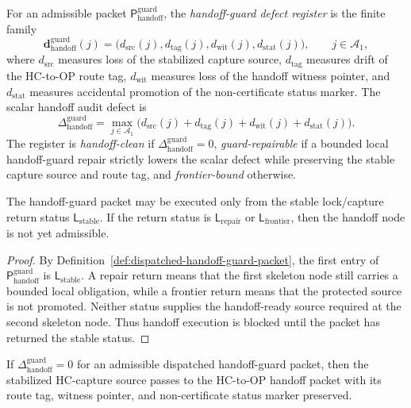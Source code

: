 \begin{definition}
\label{def:handoff-guard-defect-register}
For an admissible packet \(\mathsf P_{\mathrm{handoff}}^{\mathrm{guard}}\), the \emph{handoff-guard defect register} is the finite family
\[
 \mathbf d_{\mathrm{handoff}}^{\mathrm{guard}}(j)
 =
 \bigl(d_{\mathrm{src}}(j),d_{\mathrm{tag}}(j),d_{\mathrm{wit}}(j),d_{\mathrm{stat}}(j)\bigr),
 \qquad j\in\mathcal A_1,
\]
where \(d_{\mathrm{src}}\) measures loss of the stabilized capture source, \(d_{\mathrm{tag}}\) measures drift of the HC-to-OP route tag, \(d_{\mathrm{wit}}\) measures loss of the handoff witness pointer, and \(d_{\mathrm{stat}}\) measures accidental promotion of the non-certificate status marker. The scalar handoff audit defect is
\[
 \Delta_{\mathrm{handoff}}^{\mathrm{guard}}
 =
 \max_{j\in\mathcal A_1}
 \bigl(d_{\mathrm{src}}(j)+d_{\mathrm{tag}}(j)+d_{\mathrm{wit}}(j)+d_{\mathrm{stat}}(j)\bigr).
\]
The register is \emph{handoff-clean} if \(\Delta_{\mathrm{handoff}}^{\mathrm{guard}}=0\), \emph{guard-repairable} if a bounded local handoff-guard repair strictly lowers the scalar defect while preserving the stable capture source and route tag, and \emph{frontier-bound} otherwise.
\end{definition}

\begin{lemma}
\label{lem:stable-lock-return-is-handoff-precondition}
The handoff-guard packet may be executed only from the stable lock/capture return status \(\mathsf L_{\mathrm{stable}}\). If the return status is \(\mathsf L_{\mathrm{repair}}\) or \(\mathsf L_{\mathrm{frontier}}\), then the handoff node is not yet admissible.
\end{lemma}

\begin{proof}
By Definition~\ref{def:dispatched-handoff-guard-packet}, the first entry of \(\mathsf P_{\mathrm{handoff}}^{\mathrm{guard}}\) is \(\mathsf L_{\mathrm{stable}}\). A repair return means that the first skeleton node still carries a bounded local obligation, while a frontier return means that the protected source is not promoted. Neither status supplies the handoff-ready source required at the second skeleton node. Thus handoff execution is blocked until the packet has returned the stable status.
\end{proof}

\begin{lemma}
\label{lem:zero-handoff-guard-defect-preserves-hcop-handoff}
If \(\Delta_{\mathrm{handoff}}^{\mathrm{guard}}=0\) for an admissible dispatched handoff-guard packet, then the stabilized HC-capture source passes to the HC-to-OP handoff packet with its route tag, witness pointer, and non-certificate status marker preserved.
\end{lemma}

